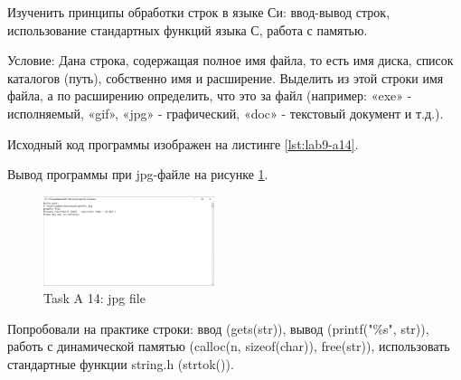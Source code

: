 \documentclass[12pt,a4paper]{article}
\begin{document}
\maketitle



\labheading



\begin{labgoal}
Изученить принципы обработки строк в языке Си: ввод-вывод строк, использование стандартных функций языка С, работа с памятью.
\end{labgoal}



\labreport

\begin{conductionA14}
Условие: Дана строка, содержащая полное имя файла, то есть имя диска, список
каталогов (путь), собственно имя и расширение. Выделить из этой строки имя
файла, а по расширению определить, что это за файл (например: «exe» -
исполняемый, «gif», «jpg» - графический, «doc» - текстовый документ и т.д.).
\end{conductionA14}



Исходный код программы изображен на листинге \ref{lst:lab9-a14}.







Вывод программы при jpg-файле на рисунке \ref{fig:a14-jpg}.



\begin{figure}[ht]
  \centering
  \includegraphics[width=5cm]{imgs/a14jpg.png}
  \caption{Task A 14: jpg file}
  \label{fig:a14-jpg}
\end{figure}



\begin{labconclusion}
Попробовали на практике строки: ввод (gets(str)), вывод (printf("\%s", str)), работь с динамической памятью (calloc(n, sizeof(char)), free(str)), использовать стандартные функции string.h (strtok()).
\end{labconclusion}
\end{document}
